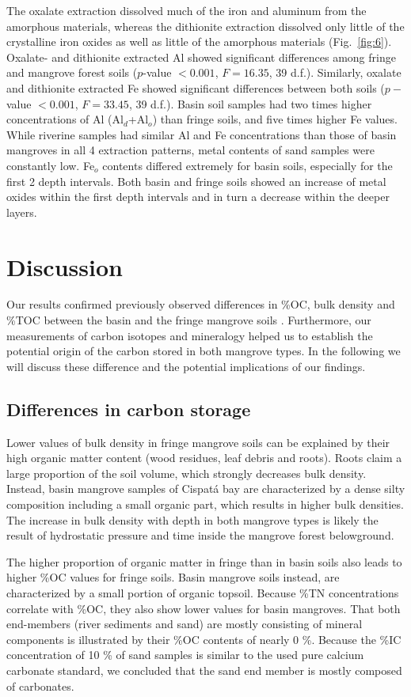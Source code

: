 The oxalate extraction dissolved much of the iron and aluminum from the amorphous materials, whereas the dithionite extraction dissolved only little of the crystalline iron oxides as well as little of the amorphous materials \mbox{(Fig. \ref{fig:6})}. Oxalate- and dithionite extracted Al showed significant differences among fringe and mangrove forest soils ($p$-value $< 0.001$, $F = 16.35$, 39 d.f.). Similarly, oxalate and dithionite extracted Fe showed significant differences between both soils ($p-$value $< 0.001$, $F = 33.45$, 39 d.f.).
Basin soil samples had two times higher concentrations of Al (Al$_d$+Al$_o$) than fringe soils, and five times higher Fe values. While riverine samples had similar Al and Fe concentrations than those of basin mangroves in all 4 extraction patterns, metal contents of sand samples were constantly low. Fe$_o$ contents differed extremely for basin soils, especially for the first 2 depth intervals. Both basin and fringe soils showed an increase of metal oxides within the first depth intervals and in turn a decrease within the deeper layers.

\section{Discussion}
Our results confirmed previously observed differences in \%OC, bulk density and \%TOC between the basin and the fringe mangrove soils \citep{Bolivar2015}.  Furthermore, our measurements of carbon isotopes and mineralogy helped us to establish the potential origin of the carbon stored in both mangrove types. In the following we will discuss these difference and the potential implications of our findings. 

\subsection{Differences in carbon storage}
Lower values of bulk density in fringe mangrove soils can be explained by their high organic matter content (wood residues, leaf debris and roots). Roots claim a large proportion of the soil volume, which strongly decreases bulk density. Instead, basin mangrove samples of Cispat\'{a} bay are characterized by a dense silty composition including a small organic part, which results in higher bulk densities. The increase in bulk density with depth in both mangrove types is likely the result of hydrostatic pressure and time inside the mangrove forest belowground.\par
The higher proportion of organic matter in fringe than in basin soils also leads to higher \%OC values for fringe soils. Basin mangrove soils instead, are characterized by a small portion of organic topsoil. Because \%TN concentrations correlate with \%OC, they also show lower values for basin mangroves. That both end-members (river sediments and sand) are mostly consisting of mineral components is illustrated by their \%OC contents of nearly 0 \%. Because the \%IC concentration of 10 \% of sand samples is similar to the used pure calcium carbonate standard, we concluded that the sand end member is mostly composed of carbonates.

